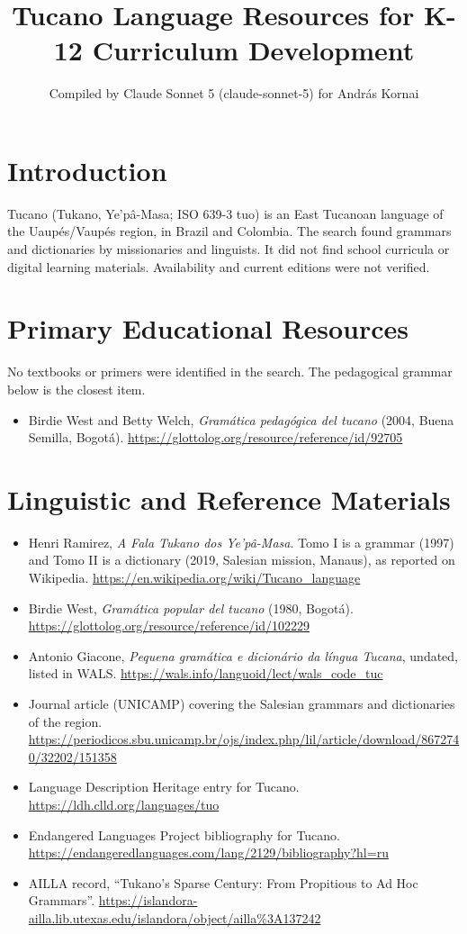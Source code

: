 \documentclass[12pt]{article}
\title{Tucano Language Resources for K-12 Curriculum Development}
\author{Compiled by Claude Sonnet 5 (claude-sonnet-5) for Andr\'as Kornai}
\date{}
\begin{document}
\maketitle

\section{Introduction}
Tucano (Tukano, Ye'p\^a-Masa; ISO 639-3 tuo) is an East Tucanoan language of the Uaup\'es/Vaup\'es region, in Brazil and Colombia. The search found grammars and dictionaries by missionaries and linguists. It did not find school curricula or digital learning materials. Availability and current editions were not verified.

\section{Primary Educational Resources}
No textbooks or primers were identified in the search. The pedagogical grammar below is the closest item.
\begin{itemize}
\item Birdie West and Betty Welch, \emph{Gram\'atica pedag\'ogica del tucano} (2004, Buena Semilla, Bogot\'a). \url{https://glottolog.org/resource/reference/id/92705}
\end{itemize}

\section{Linguistic and Reference Materials}
\begin{itemize}
\item Henri Ramirez, \emph{A Fala Tukano dos Ye'p\^a-Masa}. Tomo I is a grammar (1997) and Tomo II is a dictionary (2019, Salesian mission, Manaus), as reported on Wikipedia. \url{https://en.wikipedia.org/wiki/Tucano_language}
\item Birdie West, \emph{Gram\'atica popular del tucano} (1980, Bogot\'a). \url{https://glottolog.org/resource/reference/id/102229}
\item Antonio Giacone, \emph{Pequena gram\'atica e dicion\'ario da l\'ingua Tucana}, undated, listed in WALS. \url{https://wals.info/languoid/lect/wals_code_tuc}
\item Journal article (UNICAMP) covering the Salesian grammars and dictionaries of the region. \url{https://periodicos.sbu.unicamp.br/ojs/index.php/lil/article/download/8672740/32202/151358}
\item Language Description Heritage entry for Tucano. \url{https://ldh.clld.org/languages/tuo}
\item Endangered Languages Project bibliography for Tucano. \url{https://endangeredlanguages.com/lang/2129/bibliography?hl=ru}
\item AILLA record, ``Tukano's Sparse Century: From Propitious to Ad Hoc Grammars''. \url{https://islandora-ailla.lib.utexas.edu/islandora/object/ailla%3A137242}
\end{itemize}
\end{document}
